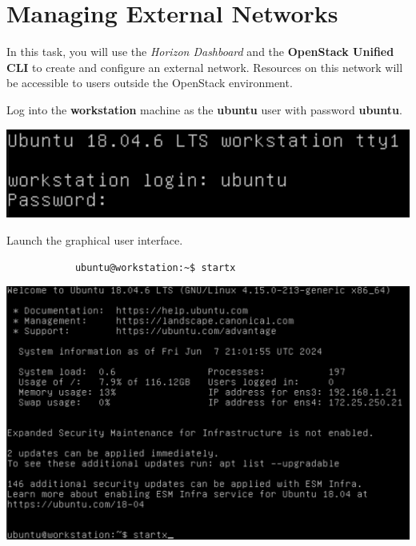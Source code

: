 \documentclass[letterpaper, 12pt]{article}
\begin{document}
\section{Managing External Networks}\label{sec:managing-external-networks}
In this task, you will use the \textit{Horizon Dashboard} and the \textbf{OpenStack Unified CLI} to create and configure an external network.
Resources on this network will be accessible to users outside the OpenStack environment.

\begin{enumerate}
    \begin{labstep}
        Log into the \textbf{workstation} machine as the \textbf{ubuntu} user with password \textbf{ubuntu}.

        \begin{center}
            \includegraphics[width=\linewidth]{images/part1/step1.png}
        \end{center}
    \end{labstep}

    \begin{labstep}
        Launch the graphical user interface.
        \begin{lstlisting}
            ubuntu@workstation:~$ startx
        \end{lstlisting}

        \begin{center}
            \includegraphics[width=\linewidth]{images/part1/step2.png}
        \end{center}
    \end{labstep}


\end{enumerate}
\end{document}
